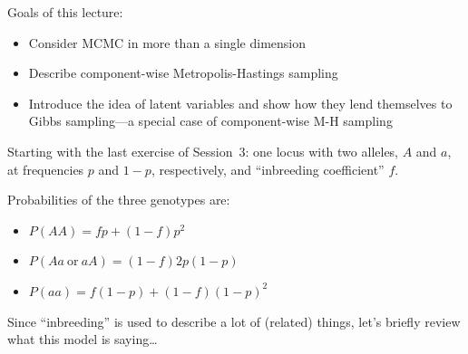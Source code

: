 











Goals of this lecture:
\begin{itemize}
\item Consider MCMC in more than a single dimension
\item Describe component-wise Metropolis-Hastings sampling 
\item Introduce the idea of latent variables and show how they lend themselves to Gibbs sampling---a special case of component-wise M-H sampling
\end{itemize}

Starting with the last exercise of Session~3: one locus with two alleles, $A$ and $a$, at frequencies $p$ and $1-p$, respectively, and ``inbreeding coefficient'' $f$.

Probabilities of the three genotypes are:
\begin{itemize}
\item $P(AA) = fp + (1-f)p^2$
\item $P(Aa~\mathrm{or}~aA) = (1-f)2p(1-p)$
\item $P(aa) = f(1-p) + (1-f)(1-p)^2$
\end{itemize}

Since ``inbreeding'' is used to describe a lot of (related) things, let's briefly review what this model is saying\ldots




